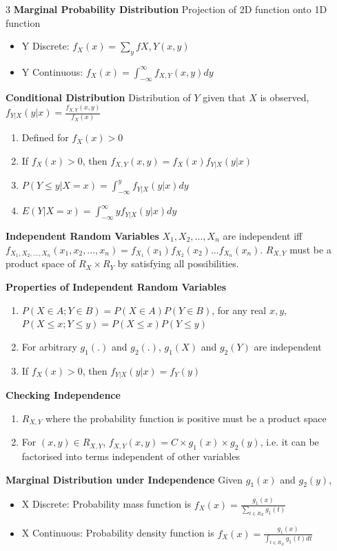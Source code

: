 \documentclass[10pt, landscape]{article}
\begin{document}
\begin{multicols*}{3}
\textbf{Marginal Probability Distribution} Projection of 2D function onto 1D function
\begin{itemize}
    \item Y Discrete: $f_X(x)=\sum_yf{X, Y}(x, y)$
    \item Y Continuous: $f_X(x)=\int_{-\infty}^\infty f_{X, Y}(x, y)dy$
\end{itemize}

\textbf{Conditional Distribution} Distribution of $Y$ given that $X$ is observed, $f_{Y|X}(y|x)=\frac{f_{X, Y}(x, y)}{f_X(x)}$
\begin{enumerate}
    \item Defined for $f_X(x)>0$
    \item If $f_X(x)>0$, then $f_{X, Y}(x, y)=f_X(x)f_{Y|X}(y|x)$
    \item $P(Y \leq y | X=x)=\int_{-\infty}^y f_{Y|X}(y|x)dy$
    \item $E(Y|X=x)=\int_{-\infty}^\infty y f_{Y|X}(y|x)dy$
\end{enumerate}

\textbf{Independent Random Variables} $X_1, X_2, ..., X_n$ are independent iff $f_{X_1, X_2, ..., X_n}(x_1, x_2, ..., x_n)=f_{X_1}(x_1)f_{X_2}(x_2)...f_{X_n}(x_n)$. $R_{X, Y}$ must be a product space of $R_X \times R_Y$ by satisfying all possibilities.

\textbf{Properties of Independent Random Variables}
\begin{enumerate}
    \item $P(X \in A; Y \in B)=P(X\in A)P(Y \in B)$, for any real $x, y$, $P(X \leq x; Y \leq y)=P(X \leq x)P(Y \leq y)$
    \item For arbitrary $g_1(.)$ and $g_2(.)$, $g_1(X)$ and $g_2(Y)$ are independent
    \item If $f_X(x) > 0$, then $f_{Y|X}(y|x)=f_Y(y)$
\end{enumerate}

\textbf{Checking Independence}
\begin{enumerate}
    \item $R_{X, Y}$ where the probability function is positive must be a product space
    \item For $(x, y) \in R_{X, Y}$, $f_{X, Y}(x, y)=C \times g_1(x) \times g_2(y)$, i.e. it can be factorised into terms independent of other variables
\end{enumerate}

\textbf{Marginal Distribution under Independence} Given $g_1(x)$ and $g_2(y)$,
\begin{itemize}
    \item X Discrete: Probability mass function is $f_X(x)=\frac{g_1(x)}{\sum_{t \in R_X}g_1(t)}$
    \item X Continuous: Probability density function is $f_X(x)=\frac{g_1(x)}{\int_{t \in R_X} g_1(t)dt}$
\end{itemize}


\end{multicols*}
\end{document}
